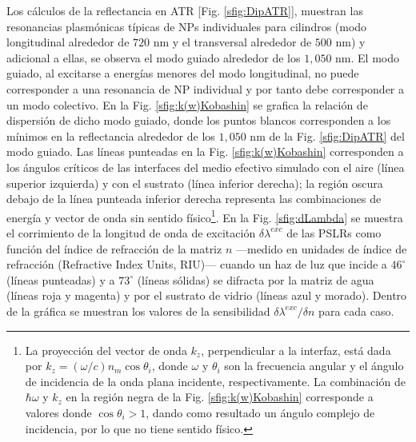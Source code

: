 Los cálculos de la reflectancia en ATR [Fig. \ref{sfig:DipATR}], muestran las resonancias plasmónicas típicas de NPs individuales para cilindros (modo longitudinal alrededor de $720$ nm y el transversal alrededor de $500$ nm) y adicional a ellas, se observa el modo guiado alrededor de los $1,050$ nm.  El modo guiado, al excitarse a energías menores del modo longitudinal, no puede corresponder a una resonancia de NP individual y por tanto debe corresponder a un modo colectivo. En la Fig.  \ref{sfig:k(w)Kobashin} se grafica la relación de dispersión de dicho modo guiado, donde los puntos blancos corresponden a los mínimos en la reflectancia alrededor de los $1,050$ nm de la Fig.  \ref{sfig:DipATR} del modo guiado.  Las líneas punteadas en la Fig.   \ref{sfig:k(w)Kobashin} corresponden a los ángulos críticos de las interfaces del medio efectivo simulado con el aire (línea superior izquierda) y con el sustrato (línea inferior derecha); la región oscura debajo de la línea punteada inferior derecha representa las combinaciones de energía y vector de onda sin sentido físico\footnote{La proyección del vector de onda $k_z$, perpendicular a la interfaz, está dada por $k_z = (\omega / c)n_m\cos\theta_i$, donde $\omega$ y $\theta_i$ son la frecuencia angular y el ángulo de incidencia de la onda plana incidente, respectivamente. La combinación de $\hbar\omega$ y $k_z$ en la región negra de la Fig. \ref{sfig:k(w)Kobashin} corresponde a valores donde $\cos\theta_i>1$, dando como resultado un ángulo complejo de incidencia, por lo que no tiene sentido físico.}.  En la Fig.  \ref{sfig:dLambda} se muestra el corrimiento de la longitud de onda de excitación $\delta\lambda^{exc}$ de las PSLRs como función del índice de refracción de la matriz $n$ ---medido en unidades de índice de refracción (Refractive Index Units, RIU)--- cuando un haz de luz que incide a $46^\circ$ (líneas punteadas) y  a $73^\circ$ (líneas sólidas) se difracta por la matriz de agua (líneas roja y magenta) y por el sustrato de vidrio (líneas azul y morado). Dentro de la gráfica se muestran los valores de la sensibilidad $\delta \lambda^{exc} /\delta n$ para cada caso.  


